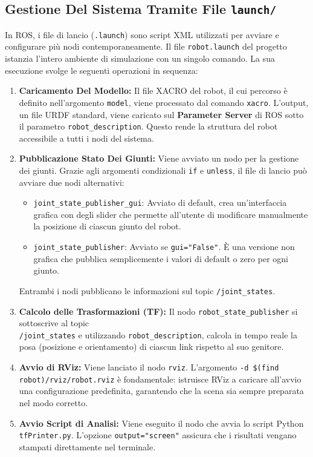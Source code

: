 \documentclass[11pt, a4paper]{report}
\begin{document}
\subsection{Gestione Del Sistema Tramite File \texttt{launch/}}
\label{subsec:file_di_lancio}
In ROS, i file di lancio (\texttt{.launch}) sono script XML utilizzati per avviare e configurare più nodi contemporaneamente. Il file \texttt{robot.launch} del progetto istanzia l'intero ambiente di simulazione con un singolo comando. La sua esecuzione svolge le seguenti operazioni in sequenza:
\begin{enumerate}
    \item \textbf{Caricamento Del Modello:} Il file XACRO del robot, il cui percorso è definito nell'argomento \texttt{model}, viene processato dal comando \texttt{xacro}. L'output, un file URDF standard, viene caricato sul \textbf{Parameter Server} di ROS sotto il parametro \texttt{robot\_description}. Questo rende la struttura del robot accessibile a tutti i nodi del sistema.

    \item \textbf{Pubblicazione Stato Dei Giunti:} Viene avviato un nodo per la gestione dei giunti. Grazie agli argomenti condizionali \texttt{if} e \texttt{unless}, il file di lancio può avviare due nodi alternativi:
    \begin{itemize}
        \item \texttt{joint\_state\_publisher\_gui}: Avviato di default, crea un'interfaccia grafica con degli slider che permette all'utente di modificare manualmente la posizione di ciascun giunto del robot.
        \item \texttt{joint\_state\_publisher}: Avviato se \texttt{gui="False"}. È una versione non grafica che pubblica semplicemente i valori di default o zero per ogni giunto.
    \end{itemize}
    Entrambi i nodi pubblicano le informazioni sul topic \texttt{/joint\_states}.

    \item \textbf{Calcolo delle Trasformazioni (TF):} Il nodo \texttt{robot\_state\_publisher} si sottoscrive al topic\\
    \texttt{/joint\_states} e utilizzando \texttt{robot\_description}, calcola in tempo reale la posa (posizione e orientamento) di ciascun link rispetto al suo genitore.

    \item \textbf{Avvio di RViz:} Viene lanciato il nodo \texttt{rviz}. L'argomento \texttt{-d \$(find robot)/rviz/robot.rviz} è fondamentale: istruisce RViz a caricare all'avvio una configurazione predefinita, garantendo che la scena sia sempre preparata nel modo corretto.

    \item \textbf{Avvio Script di Analisi:} Viene eseguito il nodo che avvia lo script Python \texttt{tfPrinter.py}. L'opzione \texttt{output="screen"} assicura che i risultati vengano stampati direttamente nel terminale.
\end{enumerate}
\newpage
\end{document}
